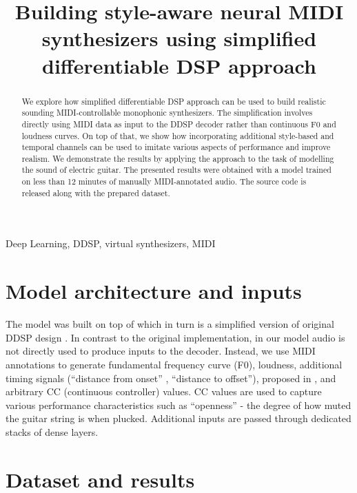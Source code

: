 \documentclass{article}
\title{Building style-aware neural MIDI synthesizers using simplified differentiable DSP approach}
\begin{document}
\tenpt
\maketitle

\begin{sloppy}
\begin{abstract}
We explore how simplified differentiable DSP approach can be used to build realistic sounding MIDI-controllable monophonic synthesizers. The simplification involves directly using  MIDI data as input to the DDSP decoder rather than continuous F0 and loudness curves. On top of that, we show how  incorporating additional style-based and temporal channels can be used to imitate various aspects of performance and improve realism.  We demonstrate the results by applying the approach to the task of modelling the sound of electric guitar. The presented results were obtained with a model trained on less than 12 minutes of manually MIDI-annotated audio. The source code is released along with the prepared dataset.
\end{abstract}

\begin{keywords}
Deep Learning, DDSP, virtual synthesizers, MIDI
\end{keywords}

\section{Model architecture and inputs}
\label{sec:architecture_and_inputs}

The model was built on top of \cite{ddsp_simplified_repo} which in turn is a simplified version of original DDSP design \cite{ddsp}. In contrast to the original implementation, in our model audio is not directly used to produce inputs to the decoder. 
Instead, we use MIDI annotations to generate fundamental frequency curve (F0), loudness, additional timing signals (``distance from onset'' , ``distance to offset''), proposed in \cite{control-synthesis}, and arbitrary CC (continuous controller) values. CC values are used to capture various performance characteristics such as ``openness'' - the degree of how muted the guitar string is when plucked.
Additional inputs are passed through dedicated stacks of dense layers.

\section{Dataset and results}
\label{sec:dataset_and_results}


\end{sloppy}
\end{document}

